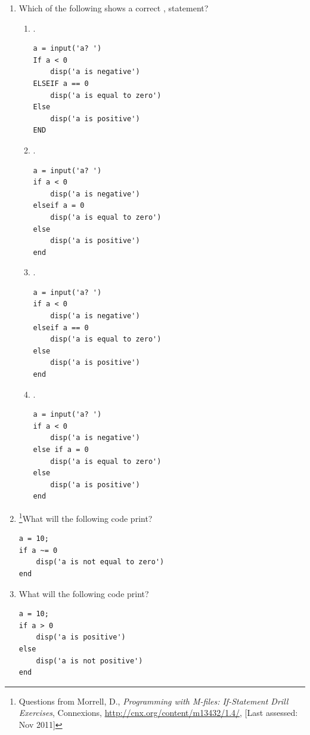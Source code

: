 \begin{enumerate}
\item Which of the following shows a correct ,  statement?
\begin{enumerate}
\item . \vspace{-2mm} 
\begin{lstlisting}
a = input('a? ')
If a < 0
	disp('a is negative')
ELSEIF a == 0
	disp('a is equal to zero')
Else
	disp('a is positive')
END
\end{lstlisting}

\item . \vspace{-2mm}
\begin{lstlisting}
a = input('a? ')
if a < 0
	disp('a is negative')
elseif a = 0
	disp('a is equal to zero')
else
	disp('a is positive')
end
\end{lstlisting}

\item . \vspace{-2mm}
\begin{lstlisting}
a = input('a? ')
if a < 0
	disp('a is negative')
elseif a == 0
	disp('a is equal to zero')
else
	disp('a is positive')
end
\end{lstlisting}

\item . \vspace{-2mm}
\begin{lstlisting}
a = input('a? ')
if a < 0
	disp('a is negative')
else if a = 0
	disp('a is equal to zero')
else
	disp('a is positive')
end
\end{lstlisting}
\end{enumerate}

\newpage
\item \footnote[2]{Questions from Morrell, D., \textit{Programming with M-files: If-Statement Drill Exercises}, Connexions, \href{http://cnx.org/content/m13432/1.4/}{http://cnx.org/content/m13432/1.4/}, [Last assessed: Nov 2011]}What will the following code print?
\begin{lstlisting}[label=lst:if_else_test1]
a = 10;
if a ~= 0
	disp('a is not equal to zero')
end
\end{lstlisting}

\item \footnotemark[2]What will the following code print?
\begin{lstlisting}
a = 10;
if a > 0
	disp('a is positive')
else
	disp('a is not positive')
end
\end{lstlisting}


\end{enumerate}
